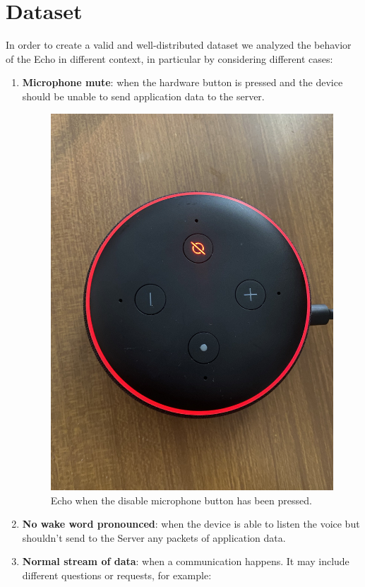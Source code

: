 \documentclass[sigconf]{acmart}
\begin{document}
    \section{Dataset}
    In order to create a valid and well-distributed dataset we analyzed the behavior of the Echo in different context, in particular by considering different cases:
    \begin{enumerate}
        \item \textbf{Microphone mute}: when the hardware button is pressed and the device should be unable to send application data to the server.
        \begin{figure}[h!]
            \includegraphics[width=0.8\linewidth]{img/alexa_red.jpg}
            \caption{Echo when the disable microphone button has been pressed.}
            \label{fig:Alexa_red_led}
        \end{figure}
        \item \textbf{No wake word pronounced}: when the device is able to listen the voice but shouldn't send to the Server any packets of application data.
        \item \textbf{Normal stream of data}: when a communication happens.
        It may include different questions or requests, for example:
        \begin{enumerate}

\end{enumerate}
\end{enumerate}
\end{document}
